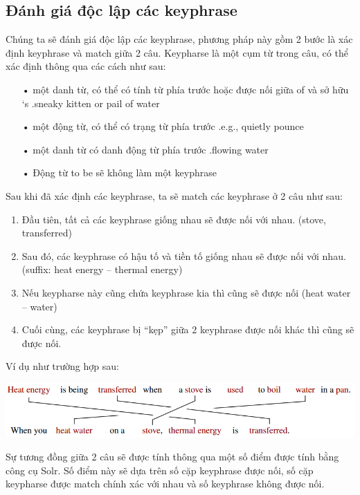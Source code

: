\documentclass[a4paper]{article}
\begin{document}
\subsection*{Đánh giá độc lập các keyphrase}
Chúng ta sẽ đánh giá độc lập các keyphrase, phương pháp này gồm 2 bước là xác định keyphrase và match giữa 2 câu.
Keypharse là một cụm từ trong câu, có thể xác định thông qua các cách như sau:
\begin{itemize} 

\item[•]	một danh từ, có thể có tính từ phía trước hoặc được nối giữa of và sở hữu ‘s
.sneaky kitten or pail of water
\item[•]	một động từ, có thể có trạng từ phía trước
.e.g., quietly pounce
\item[•]	một danh từ có danh động từ phía trước
.flowing water 
\item[•]	Động từ to be sẽ không làm một keyphrase
\end{itemize}
Sau khi đã xác định các keyphrase, ta sẽ match các keyphrase ở 2 câu như sau:
\begin{enumerate}
\item Đầu tiên, tất cả các keyphrase giống nhau sẽ được nối với nhau. 
(stove, transferred)
\item Sau đó, các keyphrase có hậu tố và tiền tố giống nhau sẽ được nối với nhau.
(suffix: heat energy – thermal energy)
\item Nếu keypharse này cũng chứa keyphrase kia thì cũng sẽ được nối
(heat water – water)
\item Cuối cùng, các keyphrase bị “kẹp” giữa 2 keyphrase được nối khác thì cũng sẽ được nối.
\end{enumerate}
Ví dụ như trường hợp sau:
\begin{center}
\includegraphics[scale=0.5]{vidu}

\end{center}
Sự tương đồng giữa 2 câu sẽ được tính thông qua một số điểm được tính bằng công cụ Solr. Số điểm này sẽ dựa trên số cặp keyphrase được nối, số cặp keypharse được match chính xác với nhau và số keyphrase không được nối.
\end{document}
